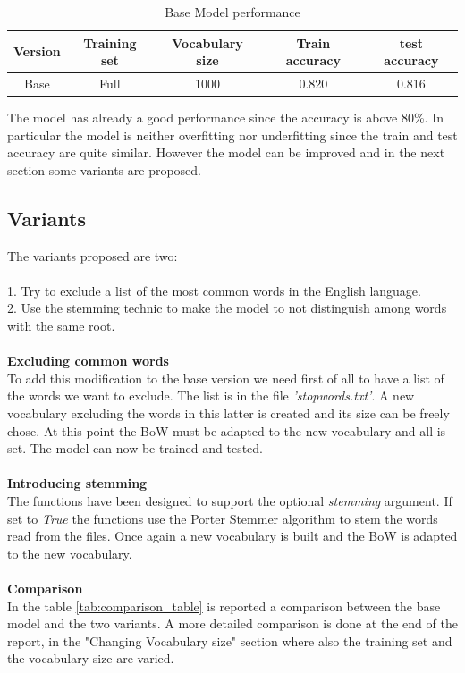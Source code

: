 \documentclass{article}
\begin{document}
    \begin{table}[H]
        \centering
        \caption{\small Base Model performance}
        \label{tab:base_model}
        \begin{tabular}{|c|c|c|c|c|}
        \hline
        \textbf{Version} & \textbf{Training set} & \textbf{Vocabulary size} & \textbf{Train accuracy} & \textbf{test accuracy}\\
        \hline
        Base & Full & 1000 & 0.820 & 0.816\\
        \hline
        \end{tabular}
    \end{table}

\noindent
The model has already a good performance since the accuracy is above 80\%. In particular the model is neither overfitting nor underfitting since the train and test accuracy are
quite similar. However the model can be improved and in the next section some variants are proposed.\\
\subsection{Variants}
The variants proposed are two:\\
\\
1. Try to exclude a list of the most common words in the English language.\\
2. Use the stemming technic to make the model to not distinguish among words with the same root.\\
\\
\textbf{Excluding common words}\\
To add this modification to the base version we need first of all to have a list of the words we want to exclude. The list is in the file \textit{'stopwords.txt'}.
A new vocabulary excluding the words in this latter is created and its size can be freely chose. At this
point the BoW must be adapted to the new vocabulary and all is set. The model can now be trained and tested.\\
\\
\textbf{Introducing stemming}\\
The functions have been designed to support the optional \textit{stemming} argument. If set to \textit{True} the
functions use the Porter Stemmer algorithm to stem the words read from the files. Once again a new vocabulary is built and the BoW is adapted to the new vocabulary.\\
\\
\textbf{Comparison}\\
In the table \ref{tab:comparison_table} is reported a comparison between the base model and the two variants. A more detailed comparison is done at the end of the report, 
in the "Changing Vocabulary size" section where also the training set and  the vocabulary size are varied.
\end{document}
